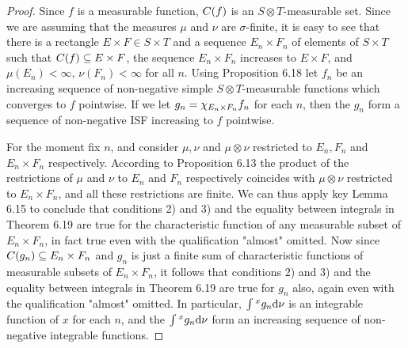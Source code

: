 \begin{proof}
Since $f$ is a measurable function, $\car{f}$ is an $S\otimes T$-measurable set. Since we are assuming that the measures $\mu$ and $\nu$ are $\sigma$-finite, it is easy to see that there is a rectangle $E\times F\in S\times T$ and a sequence $E_n\times F_n$ of elements of $S\times T$ such that $\car{f}\subseteq E\times F$, the sequence $E_n\times F_n$ increases to $E\times F$, and $\mu(E_n)<\infty$, $\nu(F_n)<\infty$ for all $n$. Using Proposition 6.18 let $f_n$ be an increasing sequence of non-negative simple $S\otimes T$-measurable functions which converges to $f$ pointwise. If we let $g_n=\idf{E_n\times F_n}f_n$ for each $n$, then the $g_n$ form a sequence of non-negative ISF increasing to $f$ pointwise.

For the moment fix $n$, and consider $\mu,\nu$ and $\mu\otimes\nu$ restricted to $E_n, F_n$ and $E_n\times F_n$ respectively. According to Proposition 6.13 the product of the restrictions of $\mu$ and $\nu$ to $E_n$ and $F_n$ respectively coincides with $\mu\otimes\nu$ restricted to $E_n\times F_n$, and all these restrictions are finite. We can thus apply key Lemma 6.15 to conclude that conditions 2) and 3) and the equality between integrals in Theorem 6.19 are true for the characteristic function of any measurable subset of $E_n\times F_n$, in fact true even with the qualification "almost" omitted. Now since $\car{g_n}\subseteq E_n\times F_n$ and $g_n$ is just a finite sum of characteristic functions of measurable subsets of $E_n\times F_n$, it follows that conditions 2) and 3) and the equality between integrals in Theorem 6.19 are true for $g_n$ also, again even with the qualification "almost" omitted. In particular, $\int\xsec{g_n}{x}\dd\nu$ is an integrable function of $x$ for each $n$, and the $\int\xsec{g_n}{x}\dd\nu$ form an increasing sequence of non-negative integrable functions.


\end{proof}
